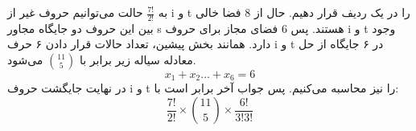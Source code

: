 \p
به
$\frac{7!}{2!}$
حالت
می‌توانیم حروف غیر از i و t را در یک ردیف قرار دهیم. حال از 8 فضا خالی بین این حروف دو جایگاه مجاور s هستند. پس 6 فضای مجاز برای حروف i و t وجود دارد.
همانند بخش پیشین، تعداد حالات قرار دادن ۶ حرف i و t در ۶ جایگاه از حل معادله سیاله زیر برابر با 
$\binom{11}{5}$
می‌شود.
$$x_1 + x_2 \ldots + x_6 = 6$$
در نهایت جایگشت حروف i و t را نیز محاسبه می‌کنیم.
پس جواب آخر برابر است با:
$$\frac{7!}{2!}\times\binom{11}{5}\times\frac{6!}{3!3!}$$
